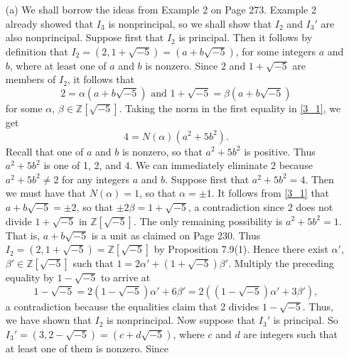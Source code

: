 \documentclass[9pt]{article}
\newcommand{\Z}{\mathbb{Z}}
\begin{document}
\begin{enumerate}
      \begin{enumerate}
         \item[(a)]
               We shall borrow the ideas from Example 2 on Page 273. Example 2
               already showed that $I_3$ is nonprincipal, so we shall show that
               $I_2$ and $I_3'$ are also nonprincipal. Suppose first that $I_2$
               is principal. Then it follows by definition that
               $I_2 = (2, 1 + \sqrt{-5}) = (a + b\sqrt{-5})$, for some integers 
               $a$ and $b$, where at least one of $a$ and $b$ is nonzero. Since 
               $2$ and $1 + \sqrt{-5}$ are members of $I_2$, it follows that
               \begin{equation} \label{3_1}
                  2 = \alpha(a + b\sqrt{-5}) \text{ and }
                  1 + \sqrt{-5} = \beta(a + b\sqrt{-5})
               \end{equation}
               for some $\alpha$, $\beta \in \Z[\sqrt{-5}]$. Taking the norm in
               the first equality in \eqref{3_1}, we get
               $$4 = N(\alpha)(a^2 + 5b^2).$$
               Recall that one of $a$ and $b$ is nonzero, so that $a^2 + 5b^2$
               is positive. Thus $a^2 + 5b^2$ is one of 1, 2, and 4. We can
               immediately eliminate 2 because $a^2 + 5b^2 \neq 2$ for any 
               integers $a$ and $b$. Suppose first that $a^2 + 5b^2 = 4$. Then 
               we must have that $N(\alpha) = 1$, so that $\alpha = \pm1$. It 
               follows from \eqref{3_1} that $a + b\sqrt{-5} = \pm2$, so that
               $\pm2\beta = 1 + \sqrt{-5}$, a contradiction since $2$ does
               not divide $1 + \sqrt{-5}$ in $\Z[\sqrt{-5}]$. The only remaining
               possibility is $a^2 + 5b^2 = 1$. That is, $a + b\sqrt{-5}$ is a
               unit as claimed on Page 230. Thus
               $I_2 = (2, 1 + \sqrt{-5}) = \Z[\sqrt{-5}]$ by Proposition 7.9(1).
               Hence there exist $\alpha'$, $\beta' \in \Z[\sqrt{-5}]$ such that
               $1 = 2\alpha' + (1 + \sqrt{-5})\beta'$. Multiply the
               preceding equality by $1 - \sqrt{-5}$ to arrive at
               $$1 - \sqrt{-5} = 2(1 - \sqrt{-5})\alpha' + 6\beta' =
                 2((1 - \sqrt{-5})\alpha' + 3\beta'),$$
               a contradiction because the equalities claim that 2 divides
               $1 - \sqrt{-5}$. Thus, we have shown that $I_2$ is nonprincipal.
               Now suppose that $I_3'$ is principal. So
               $I_3' = (3, 2 - \sqrt{-5}) = (c + d\sqrt{-5})$, where $c$ and $d$
               are integers such that at least one of them is nonzero. Since

\end{enumerate}
\end{enumerate}
\end{document}
